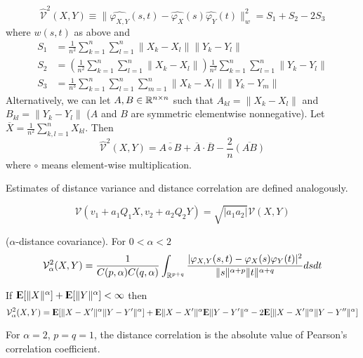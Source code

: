 \begin{prop}
$$ \widehat{\mathcal{V}}^2 (X,Y) \equiv
\| \widehat{\varphi_{X,Y}}(s,t) - \widehat{\varphi_X}(s) \widehat{\varphi_Y}(t) \|_w^2 = S_1 + S_2 - 2 S_3 $$
where $w(s,t)$ as above and
\begin{align*}
S_1 &= \frac{1}{n^2} \sum_{k=1}^n \sum_{l=1}^n \|X_k - X_l\| \|Y_k - Y_l\| \\
S_2 &= \left( \frac{1}{n^2} \sum_{k=1}^n \sum_{l=1}^n \|X_k - X_l\| \right) \frac{1}{n^2} \sum_{k=1}^n \sum_{l=1}^n \|Y_k - Y_l\| \\
S_3 &= \frac{1}{n^3} \sum_{k=1}^n \sum_{l=1}^n \sum_{m=1}^n \|X_k - X_l\| \|Y_k - Y_m\|
\end{align*}
Alternatively, we can let $A, B \in \mathbb{R}^{n \times n}$ such that
$A_{kl} = \|X_k - X_l\|$ and $B_{kl} = \|Y_k - Y_l\|$ ($A$ and $B$ are
symmetric elementwise nonnegative). Let
$\overline{X} = \frac{1}{n^2} \sum_{k,l = 1}^n X_{kl}$. Then
$$ \hat{\mathcal{V}}^2 (X,Y)
 = \overline{A \circ B} + \overline{A} \cdot \overline{B} - \frac{2}{n}
   \overline{(A B)} $$
where $\circ$ means element-wise multiplication.
\end{prop}

Estimates of distance variance and distance correlation are defined analogously.

\begin{prop}
$$ \mathcal{V}(v_1 + a_1 Q_1 X, v_2 + a_2 Q_2 Y)
 = \sqrt{|a_1 a_2|} \mathcal{V}(X,Y) $$
\end{prop}

\begin{definition}
($\alpha$-distance covariance). For $0 < \alpha < 2$
$$ \mathcal{V}_\alpha^2 (X,Y)
 = \frac{1}{C(p,\alpha) C(q,\alpha)}
   \int_{\mathbb{R}^{p+q}} \frac{|\varphi_{X,Y}(s,t) - \varphi_X(s) \varphi_Y(t)|^2}
                        {\|s\|^{\alpha + p} \|t\|^{\alpha + q}} ds dt $$
\end{definition}

\begin{prop}
If ${\rm I\kern-.3em E}[\|X\|^\alpha] + {\rm I\kern-.3em E}[\|Y\|^\alpha] < \infty$ then
$$ \mathcal{V}_\alpha^2 (X,Y) = {\rm I\kern-.3em E}[ \|X - X'\|^\alpha \|Y - Y'\|^\alpha ] + {\rm I\kern-.3em E} \|X - X'\|^\alpha {\rm I\kern-.3em E} \|Y - Y'\|^\alpha - 2 {\rm I\kern-.3em E}[ \|X - X'\|^\alpha \|Y - Y''\|^\alpha ]$$
\end{prop}

\begin{corollary}
For $\alpha = 2$, $p = q = 1$, the distance correlation is the absolute value of Pearson's correlation coefficient.
\end{corollary}
